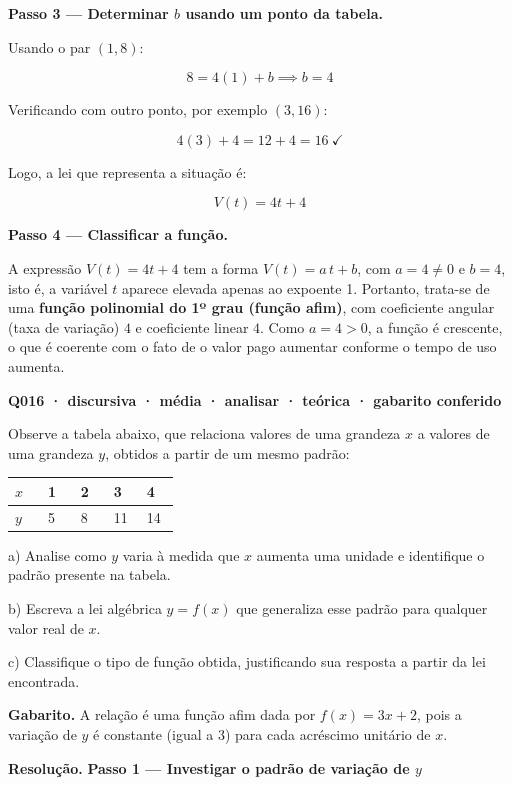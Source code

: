 \documentclass[11pt,a4paper]{article}
\begin{document}
\textbf{Passo 3 — Determinar $b$ usando um ponto da tabela.}

Usando o par $(1, 8)$:

$$8 = 4(1) + b \implies b = 4$$

Verificando com outro ponto, por exemplo $(3,16)$:

$$4(3)+4 = 12+4 = 16 \ \checkmark$$

Logo, a lei que representa a situação é:

$$V(t) = 4t + 4$$

\textbf{Passo 4 — Classificar a função.}

A expressão $V(t) = 4t + 4$ tem a forma $V(t) = a\,t + b$, com $a = 4 \neq 0$ e $b = 4$, isto é, a variável $t$ aparece elevada apenas ao expoente 1. Portanto, trata-se de uma \textbf{função polinomial do 1º grau (função afim)}, com coeficiente angular (taxa de variação) $4$ e coeficiente linear $4$. Como $a=4>0$, a função é crescente, o que é coerente com o fato de o valor pago aumentar conforme o tempo de uso aumenta.

\bigskip\noindent\textbf{Q016 · discursiva · média · analisar · teórica · gabarito conferido}\par\nopagebreak
Observe a tabela abaixo, que relaciona valores de uma grandeza $x$ a valores de uma grandeza $y$, obtidos a partir de um mesmo padrão:

\begin{center}
\begin{tabular}{|p{0.172\linewidth}|p{0.172\linewidth}|p{0.172\linewidth}|p{0.172\linewidth}|p{0.172\linewidth}|}
\hline
\textbf{$x$} & \textbf{1} & \textbf{2} & \textbf{3} & \textbf{4} \\
\hline
$y$ & 5 & 8 & 11 & 14 \\
\hline
\end{tabular}
\end{center}

a) Analise como $y$ varia à medida que $x$ aumenta uma unidade e identifique o padrão presente na tabela.

b) Escreva a lei algébrica $y = f(x)$ que generaliza esse padrão para qualquer valor real de $x$.

c) Classifique o tipo de função obtida, justificando sua resposta a partir da lei encontrada.

\textbf{Gabarito.} A relação é uma função afim dada por $f(x) = 3x + 2$, pois a variação de $y$ é constante (igual a 3) para cada acréscimo unitário de $x$.

\textbf{Resolução.} \textbf{Passo 1 — Investigar o padrão de variação de $y$}
\end{document}
